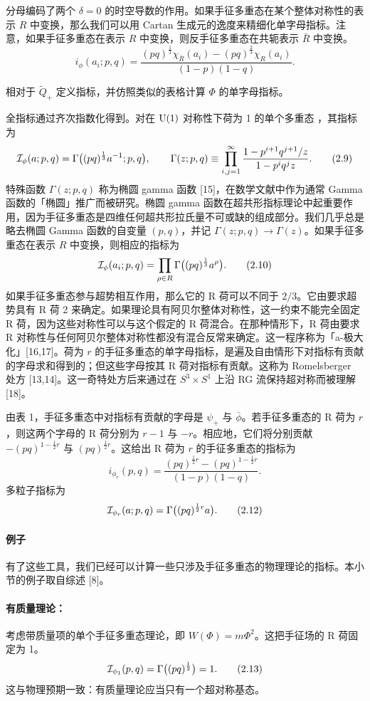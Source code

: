 分母编码了两个 $\delta=0$ 的时空导数的作用。如果手征多重态在某个整体对称性的表示 $R$ 中变换，那么我们可以用 Cartan 生成元的逸度来精细化单字母指标。注意，如果手征多重态在表示 $R$ 中变换，则反手征多重态在共轭表示 $\bar R$ 中变换。
\[
i_\phi(a_i;p,q)=\frac{(pq)^{\frac13}\chi_{\bar R}(a_i)-(pq)^{\frac23}\chi_R(a_i)}{(1-p)(1-q)} .
\tag{2.8}
\]
\begin{exercise}[2.1]
相对于 $\tilde Q_{\dot+}$ 定义指标，并仿照类似的表格计算 $\Phi$ 的单字母指标。
\end{exercise}
全指标通过齐次指数化得到。对在 $\operatorname{U}(1)$ 对称性下荷为 1 的单个多重态
，其指标为
\[
\mathcal{I}_\phi(a;p,q)=\Gamma\big((pq)^{\frac13}a^{-1};p,q\big),\qquad
\Gamma(z;p,q)\equiv\prod_{i,j=1}^{\infty}\frac{1-p^{i+1}q^{j+1}/z}{1-p^iq^jz} .
\tag{2.9}
\]
特殊函数 $\Gamma(z;p,q)$ 称为椭圆 gamma 函数 [15]，在数学文献中作为通常 Gamma 函数的「椭圆」推广而被研究。椭圆 gamma 函数在超共形指标理论中起重要作用，因为手征多重态是四维任何超共形拉氏量不可或缺的组成部分。我们几乎总是略去椭圆 Gamma 函数的自变量 $(p,q)$，并记 $\Gamma(z;p,q)\to\Gamma(z)$。如果手征多重态在表示 $R$ 中变换，则相应的指标为
\[
\mathcal{I}_\phi(a_i;p,q)=\prod_{\rho\in R}\Gamma\big((pq)^{\frac13}a^\rho\big) .
\tag{2.10}
\]
如果手征多重态参与超势相互作用，那么它的 R 荷可以不同于 $2/3$。它由要求超势具有 R 荷 2 来确定。如果理论具有阿贝尔整体对称性，这一约束不能完全固定 R 荷，因为这些对称性可以与这个假定的 R 荷混合。在那种情形下，R 荷由要求 R 对称性与任何阿贝尔整体对称性都没有混合反常来确定。这一程序称为「a-极大化」[16,17]。荷为 $r$ 的手征多重态的单字母指标，是遍及自由情形下对指标有贡献的字母求和得到的；但这些字母按其 R 荷对指标有贡献。这称为 Romelsberger 处方 [13,14]。这一奇特处方后来通过在 $S^3\times S^1$ 上沿 RG 流保持超对称而被理解 [18]。

由表 1，手征多重态中对指标有贡献的字母是 $\psi_+$ 与 $\bar\phi$。若手征多重态的 R 荷为 $r$，则这两个字母的 R 荷分别为 $r-1$ 与 $-r$。相应地，它们将分别贡献 $-(pq)^{1-\frac12 r}$ 与 $(pq)^{\frac12 r}$。这给出 R 荷为 $r$ 的手征多重态的指标为
\[
i_{\phi_r}(p,q)=\frac{(pq)^{\frac12 r}-(pq)^{1-\frac12 r}}{(1-p)(1-q)} .
\tag{2.11}
\]
多粒子指标为
\[
\mathcal{I}_{\phi_r}(a;p,q)=\Gamma\big((pq)^{\frac12 r}a\big) .
\tag{2.12}
\]

\paragraph{例子} 有了这些工具，我们已经可以计算一些只涉及手征多重态的物理理论的指标。本小节的例子取自综述 [8]。

\paragraph{有质量理论：} 考虑带质量项的单个手征多重态理论，即 $W(\Phi)=m\Phi^2$。这把手征场的 R 荷固定为 1。
\[
\mathcal{I}_{\phi_1}(p,q)=\Gamma\big((pq)^{\frac12}\big)=1 .
\tag{2.13}
\]
这与物理预期一致：有质量理论应当只有一个超对称基态。

